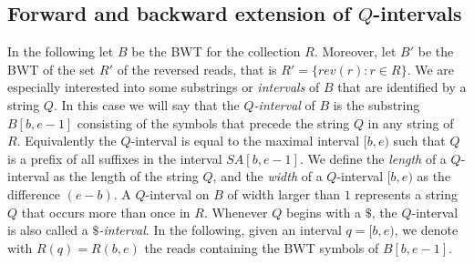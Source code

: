 \documentclass[runningheads,envcountsame,a4paper]{llncs}
\begin{document}



\subsection{Forward and backward extension of $Q$-intervals}

In the following let $B$ be the BWT for the collection $R$.
Moreover, let $B'$ be the BWT of the set $R'$ of the reversed reads,
that is $R' = \{ rev(r): r \in R\}$.
We are especially interested into some substrings or \emph{intervals} of $B$ that are identified by
a string $Q$.
In this case we will say that the \emph{$Q$-interval} of $B$ is the substring $B[b, e -1]$
consisting of the symbols that precede the string $Q$ in any string of $R$.
Equivalently the $Q$-interval is equal to the maximal interval $[b, e)$ such that
$Q$ is a prefix of all suffixes in the interval $SA[b, e-1]$.
We define the \emph{length} of a $Q$-interval as the length of
the string $Q$, and the \emph{width} of a $Q$-interval $[b, e)$ as the
difference $(e-b)$.
A $Q$-interval on $B$ of width larger than $1$ represents a string $Q$
that occurs more than once in $R$.
Whenever $Q$ begins with a $\$$, the $Q$-interval is also called a \emph{$\$$-interval}.
In the following, given an interval $q=[b,e)$, we denote with $R(q)=R(b,e)$ the reads containing the
BWT symbols of $B[b, e-1]$.
\end{document}
